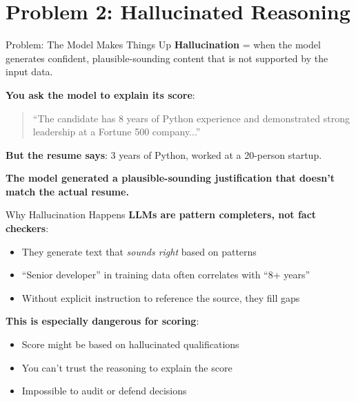 \documentclass[aspectratio=169]{beamer}
\begin{document}
\section{Problem 2: Hallucinated Reasoning}

\begin{frame}{Problem: The Model Makes Things Up}
\textbf{Hallucination} = when the model generates confident, plausible-sounding content that is not supported by the input data.
\vspace{0.3cm}

\textbf{You ask the model to explain its score}:
\vspace{0.2cm}

\begin{quote}
``The candidate has 8 years of Python experience and demonstrated strong leadership at a Fortune 500 company...''
\end{quote}
\vspace{0.2cm}

\textbf{But the resume says}: 3 years of Python, worked at a 20-person startup.
\vspace{0.3cm}

\textbf{The model generated a plausible-sounding justification that doesn't match the actual resume.}
\end{frame}

\begin{frame}{Why Hallucination Happens}
\textbf{LLMs are pattern completers, not fact checkers}:
\begin{itemize}
    \item They generate text that \textit{sounds right} based on patterns
    \item ``Senior developer'' in training data often correlates with ``8+ years''
    \item Without explicit instruction to reference the source, they fill gaps
\end{itemize}
\vspace{0.3cm}

\textbf{This is especially dangerous for scoring}:
\begin{itemize}
    \item Score might be based on hallucinated qualifications
    \item You can't trust the reasoning to explain the score
    \item Impossible to audit or defend decisions
\end{itemize}
\end{frame}
\end{document}

